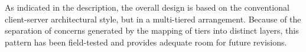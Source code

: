 \documentclass[../../main.tex]{subfiles}
\begin{document}
As indicated in the description, the overall design is based on the conventional client-server architectural style, but in a multi-tiered arrangement. Because of the separation of concerns generated by the mapping of tiers into distinct layers, this pattern has been field-tested and provides adequate room for future revisions.
\end{document}
